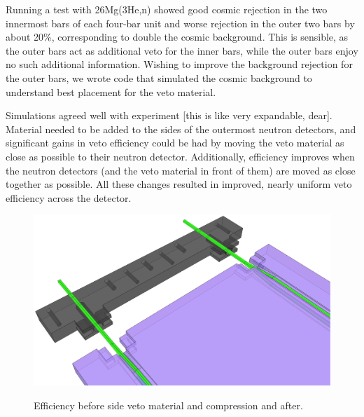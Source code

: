 Running a test with 26Mg(3He,n) showed good cosmic rejection in the two innermost bars of each four-bar unit and worse rejection in the outer two bars by about 20\%, corresponding to double the cosmic background.  This is sensible, as the outer bars act as additional veto for the inner bars, while the outer bars enjoy no such additional information.  Wishing to improve the background rejection for the outer bars, we wrote code that simulated the cosmic background to understand best placement for the veto material.

Simulations agreed well with experiment [this is like very expandable, dear].  Material needed to be added to the sides of the outermost neutron detectors, and significant gains in veto efficiency could be had by moving the veto material as close as possible to their neutron detector.  Additionally, efficiency improves when the neutron detectors (and the veto material in front of them) are moved as close together as possible.  All these changes resulted in improved, nearly uniform veto efficiency across the detector.

\begin{figure}[ht]
\centering
\includegraphics[width=1.0\textwidth]{figures/veto_assembly.eps}
\label{fig:compareEfficiency}
\caption{Efficiency before side veto material and compression and after.}
\end{figure}

